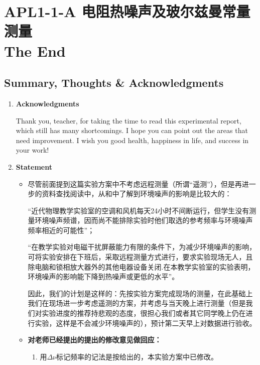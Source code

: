 
\section{APL1-1-A 电阻热噪声及玻尔兹曼常量测量 \\ The End}


\subsection{Summary, Thoughts \& Acknowledgments}
\begin{enumerate}
	\item \textbf{Acknowledgments}
	
	Thank you, teacher, for taking the time to read this experimental report, which still has many shortcomings. I hope you can point out the areas that need improvement. I wish you good health, happiness in life, and success in your work!
	
	\item \textbf{Statement}
	\begin{itemize}
		\item 尽管前面提到这篇实验方案中不考虑远程测量（所谓“遥测”），但是再进一步的资料查找阅读中，从\cite{c}和\cite{g}中了解到环境噪声的影响是比较大的：
		
		“近代物理教学实验室的空调和风机每天24小时不间断运行，但学生没有测量环境噪声频谱，因而尚不能排除实验时他们取选的参考频率与环境噪声频率相近的可能性”；
		
		“在教学实验对电磁干扰屏蔽能力有限的条件下，为减少环境噪声的影响，可将实验安排在下班后，采取远程测量方式进行，要求实验现场无人，且除电脑和锁相放大器外的其他电器设备关闭.在本教学实验室的实验表明，环境噪声的影响能下降到热噪声或更低的水平”。
		
		因此，我们的计划是这样的：先按实验方案完成现场的测量，在此基础上我们在现场进一步考虑遥测的方案，并考虑与当天晚上进行测量（但是我们对实验进度的推荐持悲观的态度，很担心我们或者其它同学晚上仍在进行实验，这样是不会减少环境噪声的），预计第二天早上对数据进行验收。
		
		\item \textbf{\textcolor{fred}{对老师已经提出的提出的修改意见做回应：}}
		\begin{enumerate}
			\item 用$\Delta\nu$标记频率的记法是按\cite{a}给出的，本实验方案中已修改。
			

\end{enumerate}
\end{itemize}
\end{enumerate}
